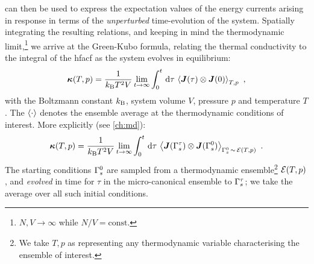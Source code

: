  can then be used to express the expectation values of the energy currents arising in response in terms of the \emph{unperturbed} time-evolution of the system. Spatially integrating the resulting relations, and keeping in mind the thermodynamic limit,\footnote{$N,V \rightarrow \infty$ while $N/V = \text{const.}$} we arrive at the Green-Kubo formula, relating the thermal conductivity to the integral of the \gls{hfacf} as the system evolves in equilibrium:
\begin{align}
    \tk (T, p)
    = \frac{1}{k_{\rm B} T^2 V }
    \lim_{t \rightarrow \infty}
    \int_0^t \,
    \intd \tau\,
    \left\langle
    \J (\tau) \otimes \J (0) 
    \right\rangle_{T,p}
    ~,
    \label{eq:gk_greenkubo}
\end{align}
with the Boltzmann constant $k_{\rm B}$, system volume $V$, pressure $p$ and temperature $T$.%
The $\braket{\cdot}$ denotes the ensemble average at the thermodynamic conditions of interest. More explicitly (see \cref{ch:md}):
\begin{align}
    \tk (T, p)
    = \frac{1}{k_{\rm B} T^2 V }
    \lim_{t \rightarrow \infty}
    \int_0^t \,
    \intd \tau\,
    \left\langle
    \J (\phasp{s}{\tau}) \otimes \J (\phasp{s}{0}) 
    \right\rangle_{\phasp{s}{0} \sampled \ensemble(T, p)}
    ~.
    \label{eq:gk_greenkubo_ensemble}
\end{align}
The starting conditions $\Gamma_{s}^{0}$ are sampled from a thermodynamic ensemble\footnote{We take $T, p$ as representing any thermodynamic variable characterising the ensemble of interest.} $\mathcal{E}(T, p)$, and \emph{evolved} in time for $\tau$ in the micro-canonical ensemble to $\Gamma_{s}^{\tau}$; we take the average over all such initial conditions.

